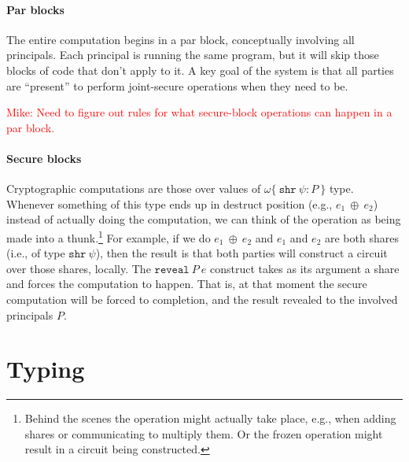 \documentclass[10pt]{article}
\newcommand{\kw}[1]{\ensuremath{\mathtt{#1}}}
\newcommand{\sshare}[1]{\ensuremath{\mathtt{shr}~{#1}}}
\newcommand{\sectyp}[3]{\ensuremath{{#1} \{~{#2}:{#3}~\}}}
\newcommand{\ebinop}[2]{\ensuremath{{#1}~\oplus~{#2}}}
\newcommand{\ereveal}[2]{\ensuremath{\kw{reveal}~{#1}~{#2}}}
\newcommand{\mwh}[1]{\textcolor{red}{Mike: #1}}
\begin{document}
\paragraph*{Par blocks}

The entire computation begins in a par block, conceptually involving
all principals. Each principal is running the same program, but it
will skip those blocks of code that don't apply to it.  A key goal of
the system is that all parties are ``present'' to perform joint-secure
operations when they need to be.

\mwh{Need to figure out rules for what secure-block operations can happen
in a par block.}

\paragraph*{Secure blocks}

Cryptographic computations are those over values of
$\sectyp{\omega}{\sshare{\psi}}{P}$ type. Whenever something of this
type ends up in destruct position (e.g., $\ebinop{e_1}{e_2}$) instead
of actually doing the computation, we can think of the operation as
being made into a thunk.\footnote{Behind the scenes the operation might
actually take place, e.g., when adding shares or communicating to
multiply them. Or the frozen operation might result in a circuit being
constructed.} For example, if we do $\ebinop{e_1}{e_2}$ and $e_1$ and
$e_2$ are both shares (i.e., of type $\sshare{\psi}$), then the result
is that both parties will construct a circuit over those shares,
locally. The $\ereveal{P}{e}$ construct takes as its argument a share and
forces the computation to happen. That is, at that moment the secure
computation will be forced to completion, and the result revealed to
the involved principals $P$.

\section{Typing}
\end{document}
